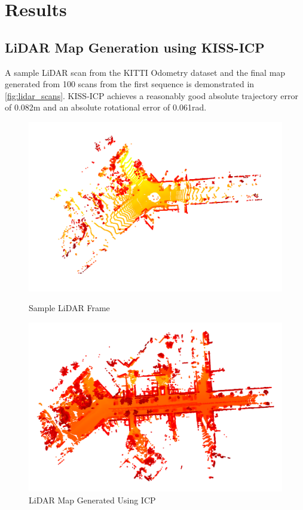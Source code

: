 \section{Results}
\label{sec:results}

\subsection{LiDAR Map Generation using KISS-ICP}

A sample LiDAR scan from the KITTI Odometry dataset and the final map generated from 100 scans from the first sequence is demonstrated in \ref{fig:lidar_scans}. KISS-ICP achieves a reasonably good absolute trajectory error of 0.082m and an absolute rotational error of 0.061rad.

\begin{figure}[t]
    \centering
    \begin{minipage}{0.49\textwidth}
        \centering
        \includegraphics[width=\textwidth]{figures/lidar_frame.png}
        \caption{Sample LiDAR Frame}
        \label{fig:lidar_frame}
    \end{minipage}
    \hfill
    \begin{minipage}{0.49\textwidth}
        \centering
        \includegraphics[width=\textwidth]{figures/lidar_map.png}
        \caption{LiDAR Map Generated Using ICP}
        \label{fig:lidar_map}
    \end{minipage}
    

\end{figure}
